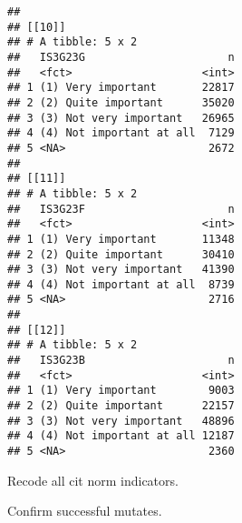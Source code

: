 \documentclass[]{article}
\newenvironment{Shaded}{\begin{snugshade}}{\end{snugshade}}
\newcommand{\DataTypeTok}[1]{\textcolor[rgb]{0.13,0.29,0.53}{#1}}
\newcommand{\KeywordTok}[1]{\textcolor[rgb]{0.13,0.29,0.53}{\textbf{#1}}}
\newcommand{\NormalTok}[1]{#1}
\newcommand{\OperatorTok}[1]{\textcolor[rgb]{0.81,0.36,0.00}{\textbf{#1}}}
\newcommand{\StringTok}[1]{\textcolor[rgb]{0.31,0.60,0.02}{#1}}
\begin{document}
\begin{verbatim}
## 
## [[10]]
## # A tibble: 5 x 2
##   IS3G23G                      n
##   <fct>                    <int>
## 1 (1) Very important       22817
## 2 (2) Quite important      35020
## 3 (3) Not very important   26965
## 4 (4) Not important at all  7129
## 5 <NA>                      2672
## 
## [[11]]
## # A tibble: 5 x 2
##   IS3G23F                      n
##   <fct>                    <int>
## 1 (1) Very important       11348
## 2 (2) Quite important      30410
## 3 (3) Not very important   41390
## 4 (4) Not important at all  8739
## 5 <NA>                      2716
## 
## [[12]]
## # A tibble: 5 x 2
##   IS3G23B                      n
##   <fct>                    <int>
## 1 (1) Very important        9003
## 2 (2) Quite important      22157
## 3 (3) Not very important   48896
## 4 (4) Not important at all 12187
## 5 <NA>                      2360
\end{verbatim}

Recode all cit norm indicators.

\begin{Shaded}
\end{Shaded}

Confirm successful mutates.

\begin{Shaded}
\end{Shaded}
\end{document}
